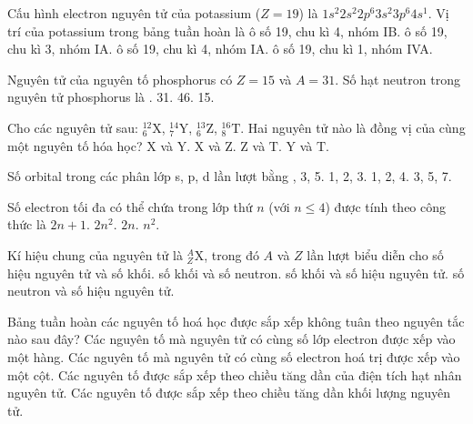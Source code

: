 \documentclass[11pt,a4paper]{article}
\begin{document}
\begin{ex}%
Cấu hình electron nguyên tử của potassium ($Z = 19$) là $1s^2 2s^2 2p^6 3s^2 3p^6 4s^1$. Vị trí của potassium trong bảng tuần hoàn là
\choice
{ô số 19, chu kì 4, nhóm IB.}
{ô số 19, chu kì 3, nhóm IA.}
{\True ô số 19, chu kì 4, nhóm IA.}
{ô số 19, chu kì 1, nhóm IVA.}

\end{ex}

\begin{ex}%
Nguyên tử của nguyên tố phosphorus có $Z = 15$ và $A = 31$. Số hạt neutron trong nguyên tử phosphorus là
\choice
{.}
{31.}
{46.}
{15.}

\end{ex}

\begin{ex}%
Cho các nguyên tử sau: $^{12}_{6}\text{X}$, $^{14}_{7}\text{Y}$, $^{13}_{6}\text{Z}$, $^{16}_{8}\text{T}$. Hai nguyên tử nào là đồng vị của cùng một nguyên tố hóa học?
\choice
{$\text{X}$ và $\text{Y}$.}
{\True $\text{X}$ và $\text{Z}$.}
{$\text{Z}$ và $\text{T}$.}
{$\text{Y}$ và $\text{T}$.}

\end{ex}

\begin{ex}%
Số orbital trong các phân lớp s, p, d lần lượt bằng
\choice
{, 3, 5.}
{1, 2, 3.}
{1, 2, 4.}
{3, 5, 7.}

\end{ex}

\begin{ex}%
Số electron tối đa có thể chứa trong lớp thứ $n$ (với $n \le 4$) được tính theo công thức là
\choice
{$2n + 1$.}
{\True $2n^2$.}
{$2n$.}
{$n^2$.}

\end{ex}

\begin{ex}%
Kí hiệu chung của nguyên tử là $^{A}_{Z}\text{X}$, trong đó $A$ và $Z$ lần lượt biểu diễn cho
\choice
{số hiệu nguyên tử và số khối.}
{số khối và số neutron.}
{\True số khối và số hiệu nguyên tử.}
{số neutron và số hiệu nguyên tử.}

\end{ex}

\begin{ex}%
Bảng tuần hoàn các nguyên tố hoá học được sắp xếp không tuân theo nguyên tắc nào sau đây?
\choice
{Các nguyên tố mà nguyên tử có cùng số lớp electron được xếp vào một hàng.}
{Các nguyên tố mà nguyên tử có cùng số electron hoá trị được xếp vào một cột.}
{Các nguyên tố được sắp xếp theo chiều tăng dần của điện tích hạt nhân nguyên tử.}
{\True Các nguyên tố được sắp xếp theo chiều tăng dần khối lượng nguyên tử.}

\end{ex}
\end{document}
